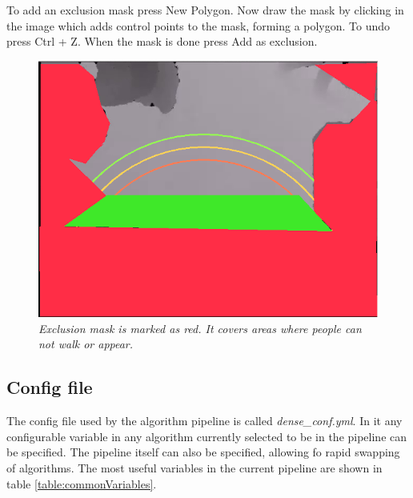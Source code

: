 To add an exclusion mask press New Polygon. Now draw the mask by clicking in the image which adds control points to the mask, forming a polygon. To undo press Ctrl + Z. When the mask is done press Add as exclusion.

\begin{figure}[H]
	\centering
	\includegraphics[width=\linewidth]{images/Manual1.png}
	\caption[Exclusion mask]{\textit{Exclusion mask is marked as red. It covers areas where people can not walk or appear.}}
	\label{fig:exMask}  %
\end{figure}

\newpage
\subsection{Config file}
The config file used by the algorithm pipeline is called \textit{dense\_conf.yml}. In it any configurable variable in any algorithm currently selected to be in the pipeline can be specified. The pipeline itself can also be specified, allowing fo rapid swapping of algorithms. The most useful variables in the current pipeline are shown in table \ref{table:commonVariables}.\\

